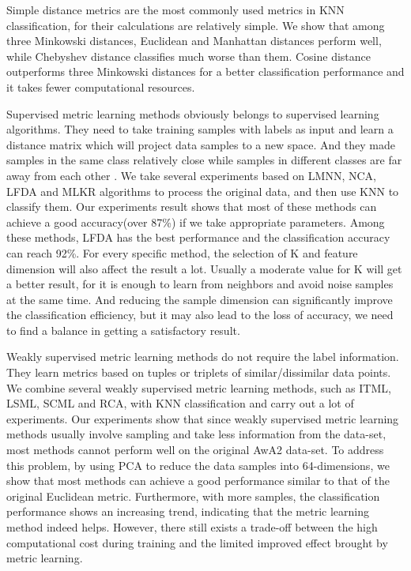 
Simple distance metrics are the most commonly used metrics in KNN classification, for their calculations are relatively simple. We show that among three Minkowski distances, Euclidean and Manhattan distances perform well, while Chebyshev distance classifies much worse than them. Cosine distance outperforms three Minkowski distances for a better classification performance and it takes fewer computational resources.


Supervised metric learning methods obviously belongs to supervised learning algorithms.  They need to take training samples with labels as input and learn a distance matrix which will project data samples to a new space.  And they made samples in the same class relatively close while samples in different classes are far away from each other . We take several experiments based on LMNN, NCA, LFDA and MLKR algorithms to process the original data, and then use KNN to classify them.  Our experiments result shows that most of these methods can achieve a good accuracy(over 87\%) if we take appropriate parameters. Among these methods, LFDA has the best performance and the classification accuracy can reach 92\%. For every specific method, the selection of  K and feature dimension will also affect the result a lot. Usually a moderate value for K will get a better result, for it is enough to learn from neighbors and avoid noise samples at the same time. And reducing the sample dimension can significantly improve the classification efficiency, but it may also lead to the loss of accuracy, we need to find a balance in getting a satisfactory result.



Weakly supervised metric learning methods do not require the label information. They learn metrics based on tuples or triplets of similar/dissimilar data points. We combine several weakly supervised metric learning methods, such as ITML, LSML, SCML and RCA, with KNN classification and carry out a lot of experiments. Our experiments show that since weakly supervised metric learning methods usually involve sampling and take less information from the data-set, most methods cannot perform well on the original AwA2 data-set. To address this problem, by using PCA to reduce the data samples into 64-dimensions, we show that most methods can achieve a good performance similar to that of the original Euclidean metric. Furthermore, with more samples, the classification performance shows an increasing trend, indicating that the metric learning method indeed helps. However, there still exists a trade-off between the high computational cost during training and the limited improved effect brought by metric learning.